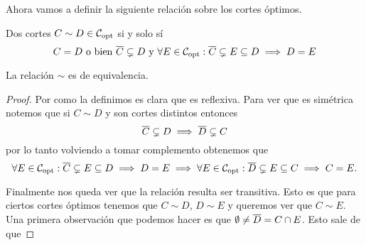 \documentclass[tesis.tex]{subfiles}
\begin{document}
Ahora vamos a definir la siguiente relación sobre los cortes óptimos.

\begin{deff}
	Dos cortes $C \sim D \in {\cal C}_{\text{opt}}$ si y solo sí
	\[
		C = D \ \text{o bien} \ \overline C \subsetneq D \ \text{y} \ \forall E \in {\cal C}_{\text{opt}} : \overline C \subsetneq E \subseteq D \implies D = E
	\]
\end{deff}

\begin{prop}
	La relación $\sim$ es de equivalencia.
\end{prop}
\begin{proof}
	Por como la definimos es clara que es reflexiva.
	Para ver que es simétrica notemos que si $C \sim D$ y son cortes distintos entonces  
	\[
		\overline C \subsetneq D \implies \overline D \subsetneq C
	\]
	por lo tanto volviendo a tomar complemento obtenemos que
	\[
	\forall E \in {\cal C}_{\text{opt}} : \overline C \subsetneq E \subseteq D \implies D = E \implies \forall E \in {\cal C}_{\text{opt}} : \overline D \subsetneq E \subseteq C \implies C = E.
	\]
	
	Finalmente nos queda ver que la relación resulta ser transitiva.
	Esto es que para ciertos cortes óptimos tenemos que $C \sim D$, $D \sim E$ y queremos ver que $C \sim E$.
	Una primera observación que podemos hacer es que $\emptyset \neq \overline D = C \cap E$.
	Esto sale de que  
	

\end{proof}
\end{document}

